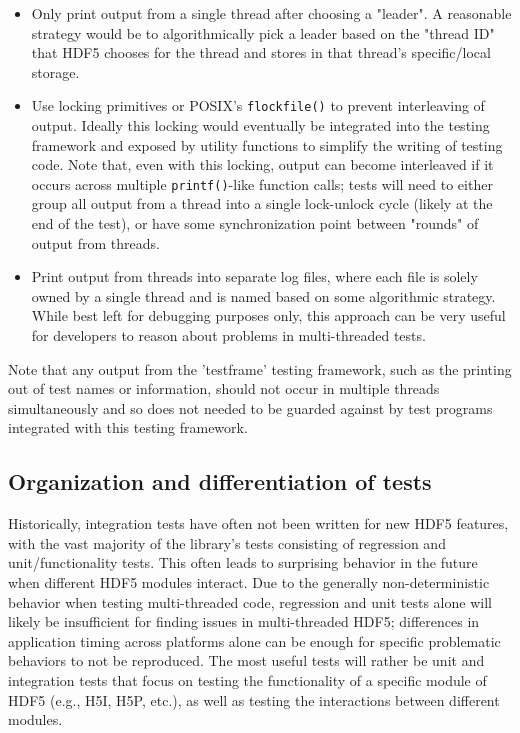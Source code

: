 \documentclass[../HDF5_RFC.tex]{subfiles}
\begin{document}
\begin{itemize}

    \item Only print output from a single thread after choosing a "leader". A reasonable strategy would be
          to algorithmically pick a leader based on the "thread ID" that HDF5 chooses for the thread and
          stores in that thread's specific/local storage.
    \item Use locking primitives or POSIX's \texttt{flockfile()} to prevent interleaving of output. Ideally
          this locking would eventually be integrated into the testing framework and exposed by utility functions to simplify the writing of testing code. Note that, even with this locking, output can become interleaved if it occurs across multiple \texttt{printf()}-like function calls; tests will need to either group all output from a thread into a single lock-unlock cycle (likely at the end
          of the test), or have some synchronization point between "rounds" of output from threads.
    \item Print output from threads into separate log files, where each file is solely owned by a single
          thread and is named based on some algorithmic strategy. While best left for debugging purposes
          only, this approach can be very useful for developers to reason about problems in multi-threaded tests.

\end{itemize}

Note that any output from the 'testframe' testing framework, such as the printing out of test names or information, should not occur in multiple threads simultaneously and so does not needed to be guarded
against by test programs integrated with this testing framework.

\subsection{Organization and differentiation of tests}

Historically, integration tests have often not been written for new HDF5 features, with the vast majority
of the library's tests consisting of regression and unit/functionality tests. This often leads to surprising behavior in the future when different HDF5 modules interact. Due to the generally non-deterministic behavior when testing multi-threaded code, regression and unit tests alone will likely be insufficient for finding issues in multi-threaded HDF5; differences in application timing across platforms alone can be enough for specific problematic behaviors to not be reproduced. The most useful tests will rather be unit and
integration tests that focus on testing the functionality of a specific module of HDF5 (e.g., H5I, H5P,
etc.), as well as testing the interactions between different modules.
\end{document}
